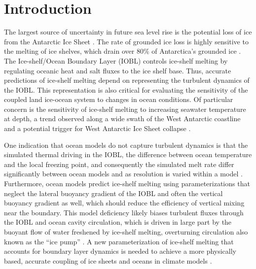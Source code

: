 \documentclass[draft]{agujournal2019}
\begin{document}
\section{Introduction}

The largest source of uncertainty in future sea level rise is the potential loss of ice from the Antarctic Ice Sheet \cite{ipcc_climate_2014}. The rate of grounded ice loss is highly sensitive to the melting of ice shelves, which drain over 80\% of Antarctica’s grounded ice \cite{reese_far_2018, rignot_ice-shelf_2013}. The Ice-shelf/Ocean Boundary Layer (IOBL) controls ice-shelf melting by regulating oceanic heat and salt fluxes to the ice shelf base. Thus, accurate predictions of ice-shelf melting depend on representing the turbulent dynamics of the IOBL. This representation is also critical for evaluating the sensitivity of the coupled land ice-ocean system to changes in ocean conditions. Of particular concern is the sensitivity of ice-shelf melting to increasing seawater temperature at depth, a trend observed along a wide swath of the West Antarctic coastline and a potential trigger for West Antarctic Ice Sheet collapse \cite{ruan_ice-shelf_2021, schmidtko_multidecadal_2014, purkey_unabated_2018, wahlin_pathways_2021}. 

One indication that ocean models do not capture turbulent dynamics is that the simulated thermal driving in the IOBL, the difference between ocean temperature and the local freezing point, and consequently the simulated melt rate differ significantly between ocean models and as resolution is varied within a model \cite{gwyther_cold_2020}. Furthermore, ocean models predict ice-shelf melting using parameterizations that neglect the lateral buoyancy gradient of the IOBL and often the vertical buoyancy gradient as well, which should reduce the efficiency of vertical mixing near the boundary. This model deficiency likely biases turbulent fluxes through the IOBL and ocean cavity circulation, which is driven in large part by the buoyant flow of water freshened by ice-shelf melting, overturning circulation also known as the ``ice pump'' \cite{webber_impact_2018}. A new parameterization of ice-shelf melting that accounts for boundary layer dynamics is needed to achieve a more physically based, accurate coupling of ice sheets and oceans in climate models \cite{gwyther_cold_2020, dinniman_modeling_2016, naughten_future_2018, edwards_projected_2021}.
\end{document}
